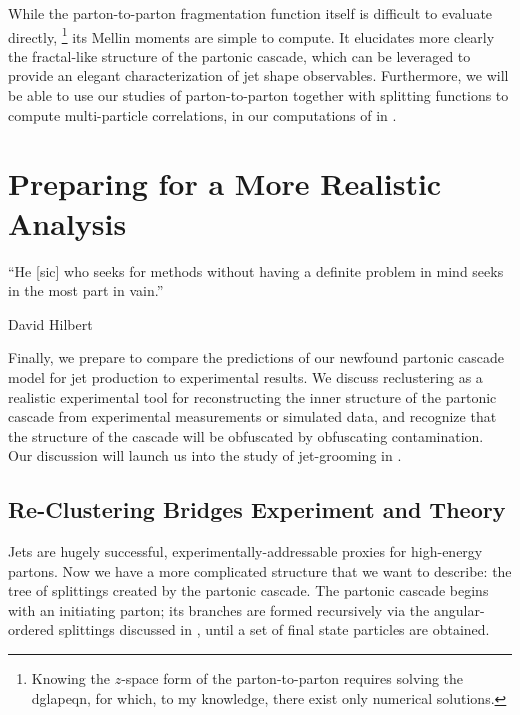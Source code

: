 While the parton-to-parton fragmentation function itself is difficult to evaluate directly,%
\footnote{
    Knowing the \(z\)-space form of the \gls{parton-to-parton} requires solving the \gls{dglapeqn}, for which, to my knowledge, there exist only numerical solutions.
}
its Mellin moments are simple to compute.
%
It elucidates more clearly the fractal-like structure of the partonic cascade, which can be leveraged to provide an elegant characterization of jet shape observables.
%
Furthermore, we will be able to use our studies of \gls{parton-to-parton} together with splitting functions to compute multi-particle correlations, in our computations of  in .




\section{Preparing for a More Realistic Analysis}
\epigraph{
    ``He [sic] who seeks for methods without having a definite problem in mind seeks in the most part in vain.''
}{David Hilbert}

Finally, we prepare to compare the predictions of our newfound partonic cascade model for jet production to experimental results.
%
We discuss reclustering as a realistic experimental tool for reconstructing the inner structure of the partonic cascade from experimental measurements or simulated data, and recognize that the structure of the cascade will be obfuscated by obfuscating contamination.
%
Our discussion will launch us into the study of \gls{jet-grooming} in .



\subsection{Re-Clustering Bridges Experiment and Theory}
\label{sec:reclustering}

Jets are hugely successful, experimentally-addressable proxies for high-energy partons.
%
Now we have a more complicated structure that we want to describe:
%
the tree of splittings created by the partonic cascade.
%
The partonic cascade begins with an initiating parton;
%
its branches are formed recursively via the angular-ordered splittings discussed in , until a set of final state particles are obtained.

